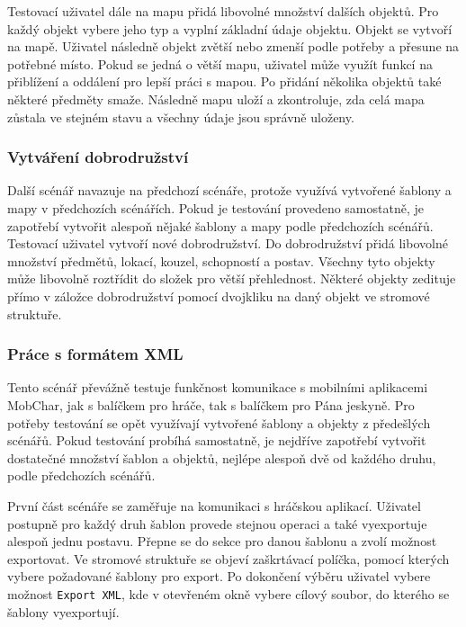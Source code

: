 \documentclass[thesis=B,czech]{resources/FITthesis}[2012/06/26]
\begin{document}
Testovací uživatel dále na mapu přidá libovolné množství dalších objektů. Pro každý objekt vybere jeho typ a vyplní základní údaje objektu. Objekt se vytvoří na mapě. Uživatel následně objekt zvětší nebo zmenší podle potřeby a přesune na potřebné místo. Pokud se jedná o větší mapu, uživatel může využít funkcí na přiblížení a oddálení pro lepší práci s mapou. Po přidání několika objektů také některé předměty smaže. Následně mapu uloží a zkontroluje, zda celá mapa zůstala ve stejném stavu a všechny údaje jsou správně uloženy.

\subsubsection{Vytváření dobrodružství}
Další scénář navazuje na předchozí scénáře, protože využívá vytvořené šablony a mapy v předchozích scénářích. Pokud je testování provedeno samostatně, je zapotřebí vytvořit alespoň nějaké šablony a mapy podle předchozích scénářů. Testovací uživatel vytvoří nové dobrodružství. Do dobrodružství přidá libovolné množství předmětů, lokací, kouzel, schopností a postav. Všechny tyto objekty může libovolně roztřídit do složek pro větší přehlednost. Některé objekty zedituje přímo v záložce dobrodružství pomocí dvojkliku na daný objekt ve stromové struktuře.

\subsubsection{Práce s formátem XML}
Tento scénář převážně testuje funkčnost komunikace s mobilními aplikacemi MobChar, jak s balíčkem pro hráče, tak s balíčkem pro Pána jeskyně. Pro potřeby testování se opět využívají vytvořené šablony a objekty z předešlých scénářů. Pokud testování probíhá samostatně, je nejdříve zapotřebí vytvořit dostatečné množství šablon a objektů, nejlépe alespoň dvě od každého druhu, podle předchozích scénářů. \par

První část scénáře se zaměřuje na komunikaci s hráčskou aplikací. Uživatel postupně pro každý druh šablon provede stejnou operaci a také vyexportuje alespoň jednu postavu. Přepne se do sekce pro danou šablonu a zvolí možnost exportovat. Ve stromové struktuře se objeví zaškrtávací políčka, pomocí kterých vybere požadované šablony pro export. Po dokončení výběru uživatel vybere možnost \texttt{Export XML}, kde v otevřeném okně vybere cílový soubor, do kterého se šablony vyexportují. \par
\end{document}
